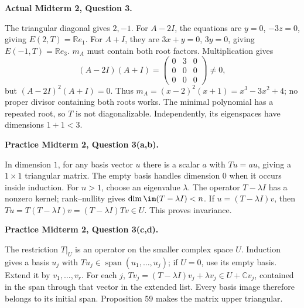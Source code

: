 \begin{prob}\textbf{Actual Midterm 2, Question 3.}\par
{}
\begin{steps}
\ii The triangular diagonal gives $2,-1$. For $A-2I$, the equations are $y=0$, $-3z=0$, giving $E(2,T)=\mathbb Re_1$. For $A+I$, they are $3x+y=0$, $3y=0$, giving $E(-1,T)=\mathbb Re_3$.
\ii $m_A$ must contain both root factors. Multiplication gives
\[ (A-2I)(A+I)=\begin{pmatrix}0&3&0\\0&0&0\\0&0&0\end{pmatrix}\ne0, \]
but $(A-2I)^2(A+I)=0$. Thus $m_A=(x-2)^2(x+1)=x^3-3x^2+4$; no proper divisor containing both roots works.
\ii The minimal polynomial has a repeated root, so $T$ is not diagonalizable. Independently, its eigenspaces have dimensions $1+1<3$.
\end{steps}\end{prob}
\begin{prob}\textbf{Practice Midterm 2, Question 3(a,b).}\par
{}
\begin{steps}
\ii In dimension $1$, for any basis vector $u$ there is a scalar $a$ with $Tu=au$, giving a $1\times1$ triangular matrix. The empty basis handles dimension $0$ when it occurs inside induction.
\ii For $n>1$, choose an eigenvalue $\lambda$. The operator $T-\lambda I$ has a nonzero kernel; rank--nullity gives $\dim\im(T-\lambda I)<n$.
\ii If $u=(T-\lambda I)v$, then $Tu=T(T-\lambda I)v=(T-\lambda I)Tv\in U$. This proves invariance.
\end{steps}\end{prob}
\begin{prob}\textbf{Practice Midterm 2, Question 3(c,d).}\par
{}
\begin{steps}
\ii The restriction $T|_U$ is an operator on the smaller complex space $U$. Induction gives a basis $u_j$ with $Tu_j\in\operatorname{span}(u_1,\ldots,u_j)$; if $U=0$, use its empty basis.
\ii Extend it by $v_1,\ldots,v_r$. For each $j$, $Tv_j=(T-\lambda I)v_j+\lambda v_j\in U+\mathbb Cv_j$, contained in the span through that vector in the extended list.
\ii Every basis image therefore belongs to its initial span. Proposition 59 makes the matrix upper triangular.
\end{steps}\end{prob}
